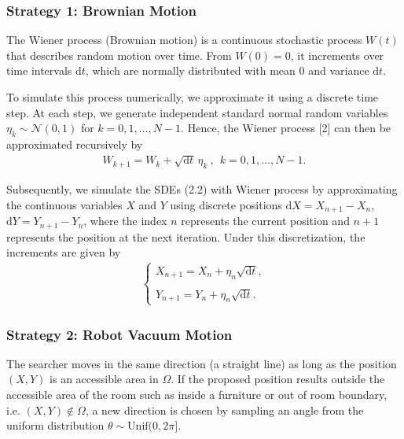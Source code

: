 \documentclass{article}
\begin{document}
\subsubsection*{Strategy 1: Brownian Motion}
\noindent The Wiener process (Brownian motion) is a continuous stochastic process $W(t)$ that describes random motion over time. From $W(0) = 0$, it increments over time intervals $\mathrm{d}t$, which are normally distributed with mean $0$ and variance $\mathrm{d}t$.

\vspace{5mm}

\noindent To simulate this process numerically, we approximate it using a discrete time step. At each step, we generate independent standard normal random variables $\eta_k \sim \mathcal{N}(0,1)$ for $k=0, 1, \dots , N-1$. Hence, the Wiener process [2] can then be approximated recursively by
\begin{align*}
     W_{k+1} = W_k + \sqrt{\mathrm{d}t}\, \eta_k \ , \ \ k=0,1,\dots,N-1.  
\end{align*}

\noindent Subsequently, we simulate the SDEs (2.2) with Wiener process by approximating the continuous variables $X$ and $Y$ using discrete positions $\mathrm{d}X = X_{n+1} - X_n$, $\mathrm{d}Y = Y_{n+1} - Y_n$, where the index $n$ represents the current position and $n+1$ represents the position at the next iteration. Under this discretization, the increments are given by
\begin{align*}
    \begin{cases}
        X_{n+1} = X_n + \eta_n\sqrt{\mathrm{d}t}, \\
        \\
        Y_{n+1} = Y_n + \eta_n\sqrt{\mathrm{d}t}.
    \end{cases}
\end{align*}

\subsubsection*{Strategy 2: Robot Vacuum Motion}
\noindent The searcher moves in the same direction (a straight line) as long as the position $(X, Y)$ is an accessible area in $\Omega$. If the proposed position results outside the accessible area of the room such as inside a furniture or out of room boundary, i.e. $(X, Y) \notin \Omega$, a new direction is chosen by sampling an angle from the uniform distribution $\theta \sim \text{Unif}(0, 2\pi]$. 
\end{document}
